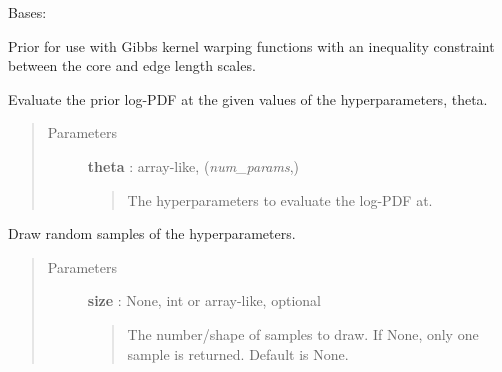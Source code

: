 \documentclass[letterpaper,10pt,english]{sphinxmanual}
\begin{document}

\begin{fulllineitems}
\label{gptools:gptools.utils.CoreEdgeJointPrior}
Bases: {\hyperref[gptools:gptools.utils.UniformJointPrior]{}}

Prior for use with Gibbs kernel warping functions with an inequality constraint between the core and edge length scales.

\begin{fulllineitems}
\label{gptools:gptools.utils.CoreEdgeJointPrior.__call__}
Evaluate the prior log-PDF at the given values of the hyperparameters, theta.
\begin{quote}\begin{description}
\item[{Parameters}] \leavevmode
\textbf{theta} : array-like, (\emph{num\_params},)
\begin{quote}

The hyperparameters to evaluate the log-PDF at.
\end{quote}

\end{description}\end{quote}

\end{fulllineitems}


\begin{fulllineitems}
\label{gptools:gptools.utils.CoreEdgeJointPrior.random_draw}
Draw random samples of the hyperparameters.
\begin{quote}\begin{description}
\item[{Parameters}] \leavevmode
\textbf{size} : None, int or array-like, optional
\begin{quote}

The number/shape of samples to draw. If None, only one sample is
returned. Default is None.
\end{quote}

\end{description}\end{quote}

\end{fulllineitems}


\end{fulllineitems}
\end{document}
